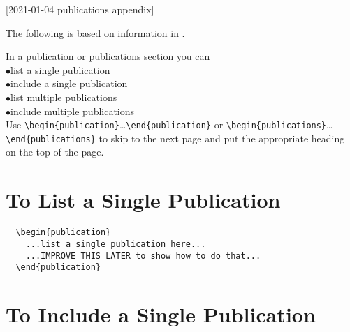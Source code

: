 [2021-01-04 publications appendix]


The following is based on information in
\cite{template1,template2,template3}.

\renewcommand{\I}{\hspace*{2\ZZparindent}$\bullet$\hspace*{1.5em}}

In a publication or publications section you can\\
  \I list a single publication\\
  \I include a single publication\\
  \I list multiple publications\\
  \I include multiple publications\\
Use\newline
\hspace*{0.5in}\verb+\begin{publication}+\ldots\verb+\end{publication}+\newline
or\newline
\hspace*{0.5in}\verb+\begin{publications}+\ldots\verb+\end{publications}+\newline
to skip to the next page and put the appropriate heading on the
top of the page.

\vspace*{1.5\baselineskip}

\section*{To List a Single Publication}

\begin{verbatim}
  \begin{publication}
    ...list a single publication here...
    ...IMPROVE THIS LATER to show how to do that...
  \end{publication}
\end{verbatim}


\section*{To Include a Single Publication}

